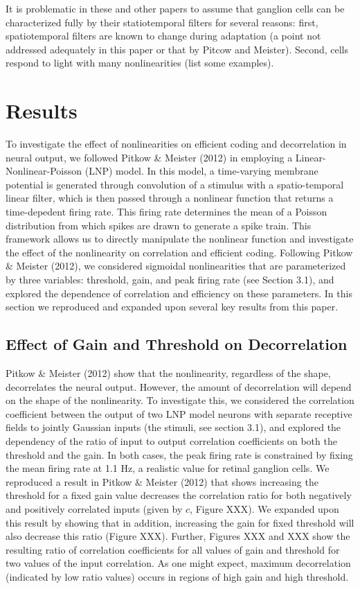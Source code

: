 \documentclass[12pt]{article}
\begin{document}
It is problematic in these and other papers to assume that ganglion cells can be characterized fully by their statiotemporal filters for several reasons: first, spatiotemporal filters are known to change during adaptation (a point not addressed adequately in this paper or that by Pitcow and Meister). Second, cells respond to light with many nonlinearities (list some examples). 

\section{Results}

To investigate the effect of nonlinearities on efficient coding and decorrelation in neural output, we followed Pitkow \& Meister (2012) in employing a Linear-Nonlinear-Poisson (LNP) model. In this model, a time-varying membrane potential is generated through convolution of a stimulus with a spatio-temporal linear filter, which is then passed through a nonlinear function that returns a time-depedent firing rate. This firing rate determines the mean of a Poisson distribution from which spikes are drawn to generate a spike train. This framework allows us to directly manipulate the nonlinear function and investigate the effect of the nonlinearity on correlation and efficient coding. Following Pitkow \& Meister (2012), we considered sigmoidal nonlinearities that are parameterized by three variables: threshold, gain, and peak firing rate (see Section 3.1), and explored the dependence of correlation and efficiency on these parameters. In this section we reproduced and expanded upon several key results from this paper.

\subsection{Effect of Gain and Threshold on Decorrelation}

Pitkow \& Meister (2012) show that the nonlinearity, regardless of the shape, decorrelates the neural output. However, the amount of decorrelation will depend on the shape of the nonlinearity. To investigate this, we considered the correlation coefficient between the output of two LNP model neurons with separate receptive fields to jointly Gaussian inputs (the stimuli, see section 3.1), and explored the dependency of the ratio of input to output correlation coefficients on both the threshold and the gain. In both cases, the peak firing rate is constrained by fixing the mean firing rate at 1.1 Hz, a realistic value for retinal ganglion cells. We reproduced a result in Pitkow \& Meister (2012) that shows increasing the threshold for a fixed gain value decreases the correlation ratio for both negatively and positively correlated inputs (given by $c$, Figure XXX). We expanded upon this result by showing that in addition, increasing the gain for fixed threshold will also decrease this ratio (Figure XXX). Further, Figures XXX and XXX show the resulting ratio of correlation coefficients for all values of gain and threshold for two values of the input correlation. As one might expect, maximum decorrelation (indicated by low ratio values) occurs in regions of high gain and high threshold.
\end{document}
